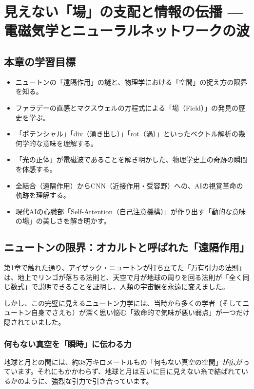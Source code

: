 \chapter{見えない「場」の支配と情報の伝播 --- 電磁気学とニューラルネットワークの波}

\section*{本章の学習目標}
\begin{itemize}
\item ニュートンの「遠隔作用」の謎と、物理学における「空間」の捉え方の限界を知る。
\item ファラデーの直感とマクスウェルの方程式による「場（Field）」の発見の歴史を学ぶ。
\item 「ポテンシャル」「div（湧き出し）」「rot（渦）」といったベクトル解析の幾何学的な意味を理解する。
\item 「光の正体」が電磁波であることを解き明かした、物理学史上の奇跡の瞬間を体感する。
\item 全結合（遠隔作用）からCNN（近接作用・受容野）への、AIの視覚革命の軌跡を理解する。
\item 現代AIの心臓部「Self-Attention（自己注意機構）」が作り出す「動的な意味の場」の美しさを解き明かす。
\end{itemize}

\section{ニュートンの限界：オカルトと呼ばれた「遠隔作用」}

第1章で触れた通り、アイザック・ニュートンが打ち立てた「万有引力の法則」は、地上でリンゴが落ちる法則と、天空で月が地球の周りを回る法則が「全く同じ数式」で説明できることを証明し、人類の宇宙観を永遠に変えました。

しかし、この完璧に見えるニュートン力学には、当時から多くの学者（そしてニュートン自身でさえも）が深く思い悩む「致命的で気味が悪い弱点」が一つだけ隠されていました。

\subsection{何もない真空を「瞬時」に伝わる力}

地球と月との間には、約38万キロメートルもの「何もない真空の空間」が広がっています。それにもかかわらず、地球と月は互いに目に見えない糸で結ばれているかのように、強烈な引力で引き合っています。

